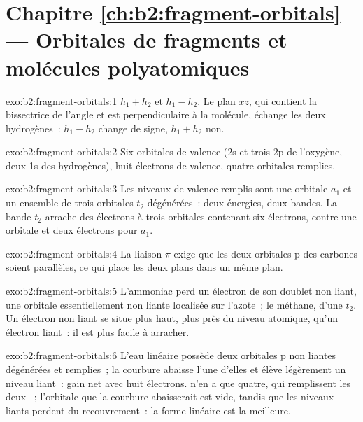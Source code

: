 \section*{Chapitre \ref{ch:b2:fragment-orbitals} --- Orbitales de fragments et molécules polyatomiques}

\begin{solution}{exo:b2:fragment-orbitals:1}
$h_1 + h_2$ et $h_1 - h_2$. Le plan $xz$, qui contient la bissectrice de l'angle et est
perpendiculaire à la molécule, échange les deux hydrogènes~: $h_1 - h_2$ change
de signe, $h_1 + h_2$ non.
\end{solution}

\begin{solution}{exo:b2:fragment-orbitals:2}
Six orbitales de valence (2s et trois 2p de l'oxygène, deux 1s des hydrogènes), huit électrons
de valence, quatre orbitales remplies.
\end{solution}

\begin{solution}{exo:b2:fragment-orbitals:3}
Les niveaux de valence remplis sont une orbitale $a_1$ et un ensemble de trois orbitales $t_2$
dégénérées~: deux énergies, deux bandes. La bande $t_2$ arrache des électrons à trois
orbitales contenant six électrons, contre une orbitale et deux électrons pour $a_1$.
\end{solution}

\begin{solution}{exo:b2:fragment-orbitals:4}
La liaison $\pi$ exige que les deux orbitales p des carbones soient parallèles, ce qui place
les deux plans  dans un même plan.
\end{solution}

\begin{solution}{exo:b2:fragment-orbitals:5}
L'ammoniac perd un électron de son doublet non liant, une orbitale essentiellement non liante localisée sur
l'azote~; le méthane, d'une  $t_2$. Un électron non liant se situe plus haut,
plus près du niveau atomique, qu'un électron liant~: il est plus facile à arracher.
\end{solution}

\begin{solution}{exo:b2:fragment-orbitals:6}
L'eau linéaire possède deux orbitales p non liantes dégénérées et remplies~; la courbure abaisse l'une
d'elles et élève légèrement un niveau liant~: gain net avec huit électrons. 
n'en a que quatre, qui remplissent les deux ~; l'orbitale que la courbure
abaisserait est vide, tandis que les niveaux liants perdent du recouvrement~: la forme linéaire est la meilleure.
\end{solution}

